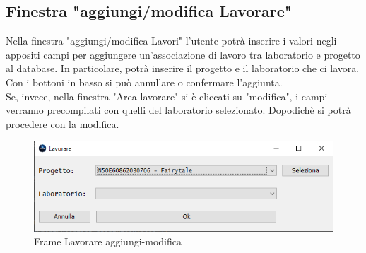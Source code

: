         \subsection {Finestra "aggiungi/modifica Lavorare"}
            Nella finestra "aggiungi/modifica Lavori" l'utente potrà inserire i valori negli appositi campi per aggiungere un'associazione di lavoro tra laboratorio e progetto al database. In particolare, potrà inserire il progetto e il laboratorio che ci lavora.\\
            Con i bottoni in basso si può annullare o confermare l'aggiunta.\\
            Se, invece, nella finestra "Area lavorare" si è cliccati su "modifica", i campi verranno precompilati con quelli del laboratorio selezionato. Dopodichè si potrà procedere con la modifica.
            \begin{figure}[htbp!]
                \centering
                    \vspace{2\baselineskip}
                    \includegraphics[width=0.7\linewidth]{Immagini/Frames/Frame aggiungi-modifica/Frame Lavorare aggiungi-modifica.png}
                \caption{Frame Lavorare aggiungi-modifica}
                \label{fig:Frame Lavorare aggiungi-modifica}
            \end{figure}